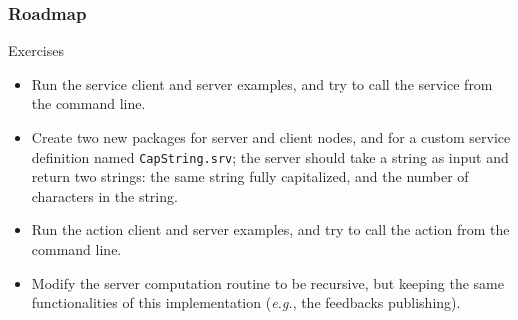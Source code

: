 \documentclass[aspectratio=169]{beamer}
\begin{document}
\frame{\titlepage}



\begin{frame}
\frametitle{Roadmap}
\tableofcontents
\end{frame}







\begin{frame}{Exercises}
  \begin{itemize}
    \item Run the service client and server examples, and try to call the service from the command line.
    \item Create two new packages for server and client nodes, and for a custom service definition named \texttt{CapString.srv}; the server should take a string as input and return two strings: the same string fully capitalized, and the number of characters in the string.
    \item Run the action client and server examples, and try to call the action from the command line.
    \item Modify the server computation routine to be recursive, but keeping the same functionalities of this implementation (\emph{e.g.}, the feedbacks publishing).
  \end{itemize}
\end{frame}
\end{document}
